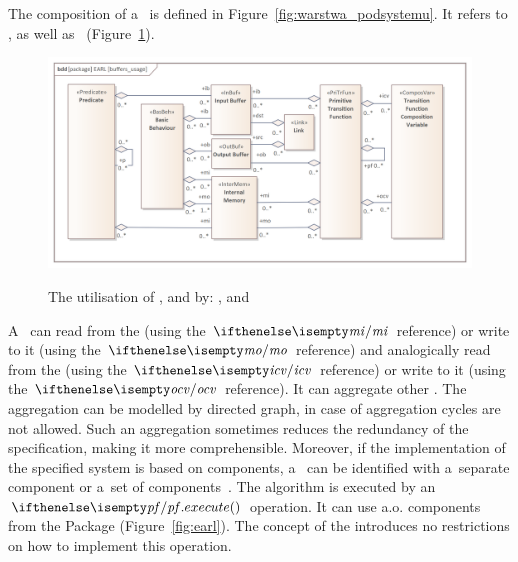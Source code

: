 \documentclass[11pt,oneside,a4paper]{article}
\newcommand{\Figure}[0]{Figure}
\begin{document}
	
	The composition of a~\PrimitiveTransitionFunction{} is defined in \Figure{}~\ref{fig:warstwa_podsystemu}.
		It refers to \InputBuffers{}, \OutputBuffers{} as well as \Subsystem{} \InternalMemory{}~(\Figure{}~\ref{fig:buffer_usage}).
		
	\begin{figure}[H]
		\centering
		\begin{center}
			{\includegraphics[width=\columnwidth]{img/basic_earl_model/buffers_usage.png}\label{aaa}}
		\end{center}
		\caption{The utilisation of \Buffers{}, \TransitionFunctionCompositionVariables{} and \InternalMemory{} by: \PrimitiveTransitionFunction{}, \Predicate{} and \Links{}}
		\label{fig:buffer_usage}
	\end{figure}	
		
		
	A~\PrimitiveTransitionFunction{} can read from the \InternalMemory{} (using the $\emi{}$ reference) or write to it (using the $\emo{}$ reference) and analogically read from the \TransitionFunctionCompositionVariable{} (using the $\eicv{}$ reference) or write to it (using the $\eocv{}$ reference).  It can aggregate other \PrimitiveTransitionFunctions{}. The aggregation can be modelled by directed graph, in case of \PrimitiveTransitionFunctions{} aggregation cycles are not allowed. Such an aggregation sometimes reduces the redundancy of the specification, making it more comprehensible. Moreover, if the implementation of the specified system is based on components, a~\PrimitiveTransitionFunction{} can be identified with a~separate component or a~set of components~\cite{dudek:2016-automation,mmar_winiarski_multibehavioral-2016}.
	The \PrimitiveTransitionFunction{} algorithm is executed by an $\epf{}.\execute{}$ operation. It can use a.o. components from the \CalculationComponentspkg{} Package (\Figure{}~\ref{fig:earl}).	The concept of the \EmbodiedAgent{} introduces no restrictions on how to implement this operation.
	
\end{document}
